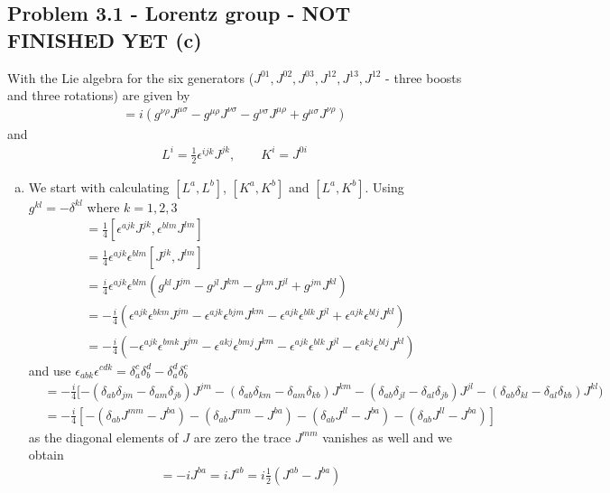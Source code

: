 \documentclass[../main.tex]{subfiles}
\begin{document}
\subsection{Problem 3.1 - Lorentz group - NOT FINISHED YET (c)}
With the Lie algebra for the six generators ($J^{01}, J^{02}, J^{03}, J^{12}, J^{13}, J^{12}$ - three boosts and three rotations) are  given by
\begin{align}
[J^{\mu\nu},J^{\rho\sigma}]=i(g^{\nu\rho}J^{\mu\sigma}-g^{\mu\rho}J^{\nu\sigma}-g^{\nu\sigma}J^{\mu\rho}+g^{\mu\sigma}J^{\nu\rho})
\end{align}
and
\begin{align}
L^i=\frac{1}{2}\epsilon^{ijk}J^{jk},\qquad K^i=J^{0i}
\end{align}
\begin{enumerate}[(a)]
\item We start with calculating $[L^a,L^b]$, $[K^a,K^b]$ and $[L^a,K^b]$.
Using $g^{kl}=-\delta^{kl}$ where $k=1,2,3$
\begin{align}
[L^a,L^b]&=\frac{1}{4}[\epsilon^{ajk}J^{jk},\epsilon^{blm}J^{lm}]\\
&=\frac{1}{4}\epsilon^{ajk}\epsilon^{blm}[J^{jk},J^{lm}]\\
&=\frac{i}{4}\epsilon^{ajk}\epsilon^{blm}(g^{kl}J^{jm}-g^{jl}J^{km}-g^{km}J^{jl}+g^{jm}J^{kl})\\
&=-\frac{i}{4}(\epsilon^{ajk}\epsilon^{bkm}J^{jm}-\epsilon^{ajk}\epsilon^{bjm}J^{km}-\epsilon^{ajk}\epsilon^{blk}J^{jl}+\epsilon^{ajk}\epsilon^{blj}J^{kl})\\
&=-\frac{i}{4}(-\epsilon^{ajk}\epsilon^{bmk}J^{jm}-\epsilon^{akj}\epsilon^{bmj}J^{km}-\epsilon^{ajk}\epsilon^{blk}J^{jl}-\epsilon^{akj}\epsilon^{blj}J^{kl})
\end{align}
and use $\epsilon_{abk}\epsilon^{cdk}=\delta^c_a\delta^d_b-\delta^d_a\delta^c_b$
\begin{align}
[L^a,L^b]
&=-\frac{i}{4}[
-(\delta_{ab}\delta_{jm}-\delta_{am}\delta_{jb})J^{jm}
-(\delta_{ab}\delta_{km}-\delta_{am}\delta_{kb})J^{km}
-(\delta_{ab}\delta_{jl}-\delta_{al}\delta_{jb})J^{jl}
-(\delta_{ab}\delta_{kl}-\delta_{al}\delta_{kb})J^{kl})\\
&=-\frac{i}{4}\left[
-(\delta_{ab}J^{mm}-J^{ba})
-(\delta_{ab}J^{mm}-J^{ba})
-(\delta_{ab}J^{ll}-J^{ba})
-(\delta_{ab}J^{ll}-J^{ba})\right]
\end{align}
as the diagonal elements of $J$ are zero the trace $J^{mm}$ vanishes as well and we obtain
\begin{align}
[L^a,L^b]
&=-iJ^{ba}=iJ^{ab}=i\frac{1}{2}(J^{ab}-J^{ba})\\

\end{align}
\end{enumerate}
\end{document}
